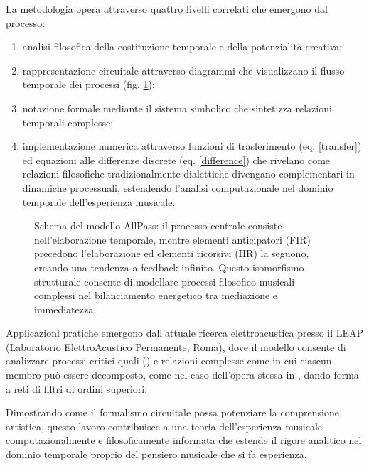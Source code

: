 La metodologia opera attraverso quattro livelli correlati che emergono dal processo:
\begin{enumerate}[nosep]
  \item analisi filosofica della costituzione temporale e della potenzialità creativa;
  \item rappresentazione circuitale attraverso diagrammi che visualizzano il flusso temporale dei processi (fig. \ref{apf});
  \item notazione formale mediante il sistema simbolico
    che sintetizza relazioni temporali complesse;
  \item implementazione numerica attraverso funzioni di trasferimento (eq. \ref{transfer}) ed equazioni alle differenze discrete (eq. \ref{difference}) che rivelano come relazioni filosofiche tradizionalmente dialettiche divengano complementari in dinamiche processuali, estendendo l'analisi computazionale nel dominio temporale dell'esperienza musicale.
\end{enumerate}

\begin{figure}[htbp]
\begin{center}
\caption{Schema del modello AllPass: il processo centrale consiste nell'elaborazione temporale, mentre elementi anticipatori (FIR) precedono l'elaborazione ed elementi ricorsivi (IIR) la seguono, creando una tendenza a feedback infinito. Questo isomorfismo strutturale consente di modellare processi filosofico-musicali complessi nel bilanciamento energetico tra mediazione e immediatezza.}
\label{apf}
\end{center}
\end{figure}

Applicazioni pratiche emergono dall'attuale ricerca elettroacustica presso il LEAP (Laboratorio ElettroAcustico Permanente, Roma), dove il modello consente di analizzare processi critici quali  (\cite{diScipio2003}) e relazioni complesse come  in cui ciascun membro può essere decomposto, come nel caso dell'opera stessa in , dando forma a reti di filtri di ordini superiori.

Dimostrando come il formalismo circuitale possa potenziare la comprensione artistica, questo lavoro contribuisce a una teoria dell'esperienza musicale computazionalmente e filosoficamente informata che estende il rigore analitico nel dominio temporale proprio del pensiero musicale che si fa esperienza.

